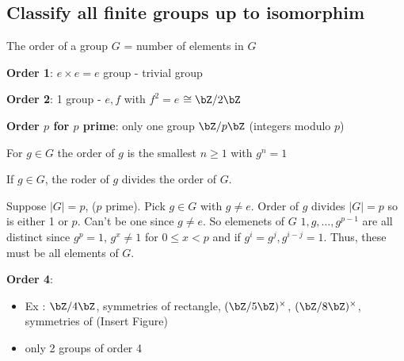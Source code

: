 \subsection{Classify all finite groups up to isomorphim}

\begin{definition}
    The order of a group $G$ = number of elements in $G$
\end{definition}

\noindent
\textbf{Order 1}: $e \times e = e$  group - trivial group

\noindent 
\textbf{Order 2}: 1 group - $e,f$ with $f^2=e$ $\cong \bZ/2\bZ$ 

\noindent
\textbf{Order $p$ for $p$ prime}: only one group $\bZ/p\bZ$ (integers modulo $p$)

\begin{definition}
    For $g \in G$ the order of $g$ is the smallest $ n \ge 1$ with $g^n=1$
\end{definition}

\begin{theorem}
    If $g \in G$, the roder of $g$ divides the order of $G$. 
\end{theorem}

\begin{example}
    Suppose $|G|=p$, ($p$ prime). Pick $g \in G$ with $g \neq e$. Order of $g$ divides $|G|=p$ so is either 1 or $p$. Can't be one since $g \neq e$. So elemenets of $G$ $1, g, \ldots, g^{p-1}$ are all distinct since $g^p=1$, $g^x \neq 1$ for $0 \le x < p$ and if $g^i = g^j, g^{i-j}=1$. Thus, these must be all elements of $G$. 
\end{example}

\noindent
\textbf{Order 4}: 
\begin{itemize}
    \item Ex : $\bZ/4\bZ$, symmetries of rectangle, $(\bZ/5\bZ)^{\times}$, $(\bZ/8\bZ)^{\times}$, symmetries of (Insert Figure)
    \item only 2 groups of order 4
\end{itemize}